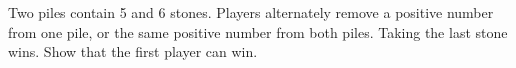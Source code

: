 Two piles contain 5 and 6 stones. Players alternately remove a positive number from one pile, or the same positive number from both piles. Taking the last stone wins. Show that the first player can win.
